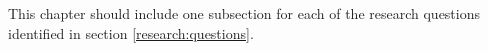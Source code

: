 \documentclass[informationsecurity]{gucmasterproject}
\begin{document}
This chapter should include one subsection for each of the research
questions identified in section \ref{research:questions}.  
%
%
%
%
%
%
%
%
\end{document}
